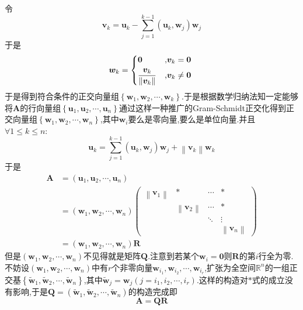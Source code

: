\begin{formal}
\begin{Proof}
        令\[
        \bm{v}_k=\bm{u}_k-\sum_{j=1}^{k-1}\left(
            \bm{u}_k,\bm{w}_j
        \right)\bm{w}_j
        \]于是\[
        \bm{w}_k=\begin{cases*}
            \bm{0}&,$\bm{v}_k=\bm{0}$\\
            \dfrac{\bm{v}_k}{\left\lVert\bm{v}_k\right\rVert}&,$\bm{v}_k\neq\bm{0}$
        \end{cases*}
        \]于是得到符合条件的正交向量组$\left\{
            \bm{w}_1,\bm{w}_2,\cdots,\bm{w}_k
        \right\}$.于是根据数学归纳法知一定能够将$\bm{A}$的行向量组$\left\{
            \bm{u}_1,\bm{u}_2,\cdots,\bm{u}_n
        \right\}$通过这样一种推广的\textup{Gram-Schmidt}正交化得到正交向量组$\left\{
            \bm{w}_1,\bm{w}_2,\cdots,\bm{w}_n
        \right\}$,其中$\bm{w}_i$要么是零向量,要么是单位向量.并且$\forall1\leqslant k\leqslant n:$\[
        \bm{u}_k=\sum_{j=1}^{k-1}\left(
            \bm{u}_k,\bm{w}_j
        \right)\bm{w}_j+\left\lVert\bm{v}_k\right\rVert\bm{w}_k
        \]于是\begin{align*}
            \bm{A}&=\left(\bm{u}_1,\bm{u}_2,\cdots,\bm{u}_n\right)\\
            &=\left(
                \bm{w}_1,\bm{w}_2,\cdots,\bm{w}_n
            \right)\begin{pmatrix}
                \left\lVert\bm{v}_1\right\rVert&*&\cdots&*\\
                &\left\lVert\bm{v}_2\right\rVert&\cdots&*\\
              &&\ddots&\vdots\\
                &&&\left\lVert\bm{v}_n\right\rVert
            \end{pmatrix}\tag{$\ast$}\\
            &=\left(
                \bm{w}_1,\bm{w}_2,\cdots,\bm{w}_n
            \right)\bm{R}
        \end{align*}但是$\left(
            \bm{w}_1,\bm{w}_2,\cdots,\bm{w}_n
        \right)$不见得就是矩阵$\bm{Q}$.注意到若某个$\bm{w}_i=\bm{0}$则$\bm{R}$的第$i$行全为零.不妨设$\left(
            \bm{w}_1,\bm{w}_2,\cdots,\bm{w}_n
        \right)$中有$r$个非零向量$\bm{w}_{i_1},\bm{w}_{i_2},\cdots,\bm{w}_{i_r}$,扩张为全空间$\mathbb{R}^n$的一组正交基$\left\{
            \widetilde{\bm{w}}_1,\widetilde{\bm{w}}_2,\cdots,\widetilde{\bm{w}}_n
        \right\}$,其中$\widetilde{\bm{w}}_j=\bm{w}_j\left(j=i_1,i_2,\cdots,i_r\right)$.这样的构造对$\ast$式的成立没有影响,于是$\bm{Q}=\left(
            \widetilde{\bm{w}}_1,\widetilde{\bm{w}}_2,\cdots,\widetilde{\bm{w}}_n
        \right)$的构造完成即\[
        \bm{A}=\bm{QR}
        \]
    \end{Proof}
\end{formal}
\newpage

